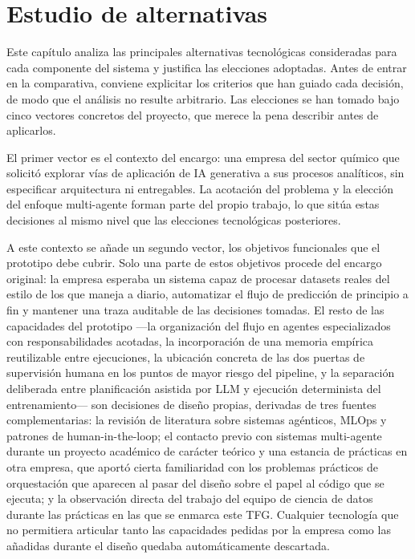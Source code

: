 \documentclass[12pt,a4paper]{article}
\theoremstyle{plain}
\begin{document}
\newpage

\section{Estudio de alternativas}
\label{sec:alternativas}

Este capítulo analiza las principales alternativas tecnológicas consideradas para cada componente del sistema y justifica las elecciones adoptadas. Antes de entrar en la comparativa, conviene explicitar los criterios que han guiado cada decisión, de modo que el análisis no resulte arbitrario. Las elecciones se han tomado bajo cinco vectores concretos del proyecto, que merece la pena describir antes de aplicarlos.

El primer vector es el contexto del encargo: una empresa del sector químico que solicitó explorar vías de aplicación de IA generativa a sus procesos analíticos, sin especificar arquitectura ni entregables. La acotación del problema y la elección del enfoque multi-agente forman parte del propio trabajo, lo que sitúa estas decisiones al mismo nivel que las elecciones tecnológicas posteriores.

A este contexto se añade un segundo vector, los objetivos funcionales que el prototipo debe cubrir. Solo una parte de estos objetivos procede del encargo original: la empresa esperaba un sistema capaz de procesar datasets reales del estilo de los que maneja a diario, automatizar el flujo de predicción de principio a fin y mantener una traza auditable de las decisiones tomadas. El resto de las capacidades del prototipo ---la organización del flujo en agentes especializados con responsabilidades acotadas, la incorporación de una memoria empírica reutilizable entre ejecuciones, la ubicación concreta de las dos puertas de supervisión humana en los puntos de mayor riesgo del pipeline, y la separación deliberada entre planificación asistida por LLM y ejecución determinista del entrenamiento--- son decisiones de diseño propias, derivadas de tres fuentes complementarias: la revisión de literatura sobre sistemas agénticos, MLOps y patrones de human-in-the-loop; el contacto previo con sistemas multi-agente durante un proyecto académico de carácter teórico y una estancia de prácticas en otra empresa, que aportó cierta familiaridad con los problemas prácticos de orquestación que aparecen al pasar del diseño sobre el papel al código que se ejecuta; y la observación directa del trabajo del equipo de ciencia de datos durante las prácticas en las que se enmarca este TFG. Cualquier tecnología que no permitiera articular tanto las capacidades pedidas por la empresa como las añadidas durante el diseño quedaba automáticamente descartada.
\end{document}
